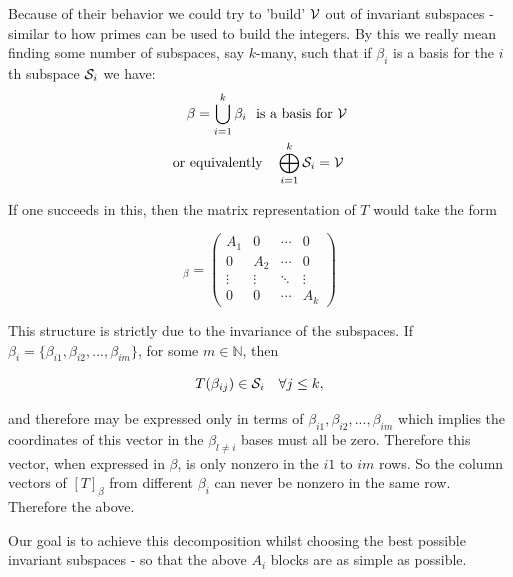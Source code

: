 Because of their behavior we could try to 'build' \(\mathcal{V}\) out of invariant subspaces - similar to how primes can be used to build the integers.
By this we really mean finding some number of subspaces, say \(k\)-many, such that if \(\beta_i\) is a basis for the \(i\)th subspace \(\mathcal{S}_i\) we have:
\begin{align*}
    & \quad \beta = \bigcup_{i=1}^k \beta_i  \  \text{ is a basis for} \ \mathcal{V} \\
    &\text{or equivalently} \quad \bigoplus_{i=1}^k\mathcal{S}_i=\mathcal{V}
\end{align*}


If one succeeds in this, then the matrix representation of \(T\) would take the form

\begin{equation*}
    [T]_\beta =
    \begin{pmatrix}
        A_1    & 0      & \cdots & 0      \\
        0      & A_2    & \cdots & 0      \\
        \vdots & \vdots & \ddots & \vdots \\
        0      & 0      & \cdots & A_k
    \end{pmatrix}
\end{equation*}

This structure is strictly due to the invariance of the subspaces. 
If \(\beta_i = \{ \beta_{i1},\beta_{i2},...,\beta_{im} \} \), for some \(m \in \mathbb{N}\), then

\begin{equation*}
    T(\beta_{ij})\in \mathcal{S}_i \quad \forall j\leq k,
\end{equation*}

and therefore may be expressed only in terms of \(\beta_{i1},\beta_{i2},...,\beta_{im}\) which implies the coordinates of this vector in the \(\beta_{l \neq i}\) bases must all be zero.
Therefore this vector, when expressed in \(\beta\), is only nonzero in the \(i1\) to \(im\) rows. So the column vectors of \([T]_\beta\) from different \(\beta_i\) can never be nonzero in the same row. Therefore the above.

\vspace{\baselineskip}

Our goal is to achieve this decomposition whilst choosing the best possible invariant subspaces - so that the above \(A_i\) blocks are as simple as possible.

